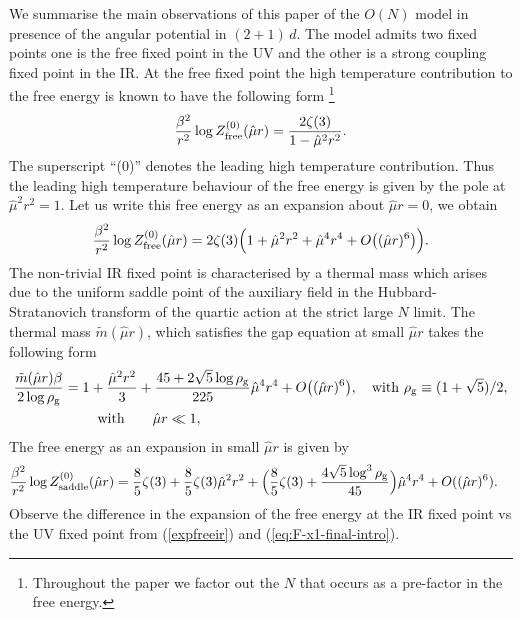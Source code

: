 \documentclass[a4paper,11pt]{article}
\begin{document}
	We summarise the  main observations of this paper  of the $O(N)$ model in presence of the angular potential in $(2+1)\, d$.  
	The model admits two fixed points one is the  free fixed point in the UV and the other  is a  strong coupling  fixed point in the IR.
	At the  free fixed point the high temperature contribution to the free energy is known to have the following form \footnote{Throughout the paper we factor out the $N$ that occurs as a pre-factor in the free energy. }
	\begin{equation}
		\frac{\beta^2}{r^2}\log Z_{\rm free}^{(0)}(\hat{\mu} r)
		=\frac{2\zeta(3)}{1-\hat \mu^2r^2}.
		\label{eq:free-leading-pole-intro}
	\end{equation}
	The superscript ``(0)'' denotes the leading high temperature contribution. Thus the leading high temperature behaviour of the free energy is given by the pole at $\hat\mu^2 r^2=1$.  Let us write this free energy as an expansion about $\hat{\mu} r=0$, we obtain
	\begin{align} \label{expfreeir}
	\frac{\beta^2}{r^2}	\log Z^{(0)}_{\rm free}(\hat\mu r)={2\zeta(3)}\Big(1+\hat\mu^2r^2+\hat{\mu}^4r^4+O\big((\hat\mu r)^6\big) \Big). 
	\end{align}
	The non-trivial  IR fixed  point is characterised by a  thermal mass which arises due to the uniform saddle point of the auxiliary field in the Hubbard-Stratanovich transform of the quartic action at  the strict large $N$ limit.
	The thermal mass   $\tilde m(\hat\mu r)$,  which satisfies  the gap equation at small $\hat \mu r$  takes the following form
	\begin{align}
		&\frac{\tilde m(\hat\mu r)\beta}{2\log\rho_{\rm g}}
		=1+\frac{\hat\mu^2r^2}{3}
		+\frac{45+2\sqrt5\log\rho_{\rm g}}{225}\hat\mu^4r^4
		+O\big((\hat\mu r)^6 \big)
		\label{eq:mass-x1-series-intro},\quad {\rm with }\ \rho_{\rm g}\equiv(1+\sqrt5)/2,  \nonumber \\ 
		& \qquad\qquad \qquad {\rm with} \qquad  \hat \mu r \ll1, 
	\end{align}
	The free energy as  an expansion  in small $\hat \mu r  $  is given by 
	\begin{align}
		&\frac{\beta^2}{r^2}\log Z_{\rm saddle}^{(0)}(\hat\mu r)
		=\frac85\zeta(3)+\frac85\zeta(3)\hat\mu^2 r^2
		+\Big(\frac85\zeta(3)
		+\frac{4\sqrt5\log^3\rho_{\rm g}}{45}\Big)\hat\mu^4r^4
		+O((\hat\mu r)^6).
		\label{eq:F-x1-final-intro}
	\end{align}
	Observe the difference in the expansion of the free energy 
	at the IR fixed point vs the UV fixed point from (\ref{expfreeir}) and (\ref{eq:F-x1-final-intro}). 
	
\end{document}
